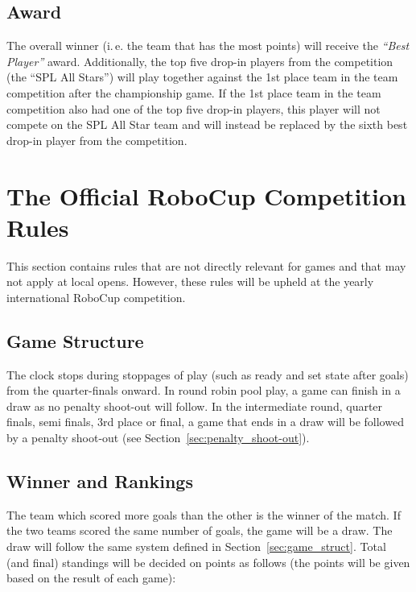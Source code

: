 \documentclass[12pt]{article}
\newcommand{\ie}{\mbox{i.\,e.}\xspace}
\begin{document}
\subsection{Award}
The overall winner (\ie the team that has the most points) will
receive the \textit{``Best Player''} award.  Additionally, the top
five drop-in players from the competition (the ``SPL All Stars'') will play together against the 1st place team in the team competition after the championship game.  If the 1st place team in the team competition also had one of the top five drop-in players, this player will not compete on the SPL All Star team and will instead be replaced by the sixth best drop-in player from the competition.


\newpage


\section{The Official RoboCup Competition Rules}
\label{sec:comRules}
This section contains rules that are not directly relevant for games and that may not apply at local opens.  However, these rules will be upheld at the yearly international RoboCup competition.

\subsection{Game Structure}

The clock stops during stoppages of play (such as ready and set state after goals) from the quarter-finals onward.  In round robin pool play, a game can finish in a draw as no penalty shoot-out will follow. In the intermediate round, quarter finals, semi finals, 3rd place or final, a game that ends in a draw will be followed by a penalty shoot-out (see Section~\ref{sec:penalty_shoot-out}).

\subsection{Winner and Rankings}

The team which scored more goals than the other is the winner of the match. If the two teams scored the same number of goals, the game will be a draw. The draw will follow the same system defined in Section~\ref{sec:game_struct}. Total (and final) standings will be decided on points as follows (the points will be given based on the result of each game):

\end{document}
